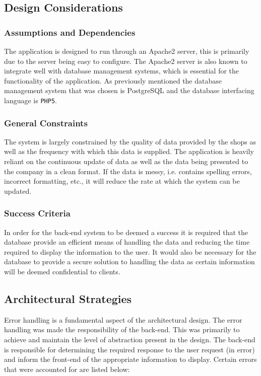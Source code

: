 \documentclass[10pt,twocolumn]{witseiepaper}
\begin{document}
	\subsection{Design Considerations}
	
		\subsubsection{Assumptions and Dependencies}
		
			The application is designed to run through an Apache2 server, this is primarily due to the server being easy to configure. The Apache2 server is also known to integrate well with database management systems, which is essential for the functionality of the application. As previously mentioned the database management system that was chosen is PostgreSQL and the database interfacing language is \texttt{PHP5}.
			
		\subsubsection{General Constraints}
			
			The system is largely constrained by the quality of data provided by the shops as well as the frequency with which this data is supplied. The application is heavily reliant on the continuous update of data as well as the data being presented to the company in a clean format. If the data is messy, i.e. contains spelling errors, incorrect formatting, etc., it will reduce the rate at which the system can be updated.
			
		\subsubsection{Success Criteria}
	
			In order for the back-end system to be deemed a success it is required that the database provide an efficient means of handling the data and reducing the time required to display the information to the user. It would also be necessary for the database to provide a secure solution to handling the data as certain information will be deemed confidential to clients.
	
	\subsection{Architectural Strategies}
	
		Error handling is a fundamental aspect of the architectural design. The error handling was made the responsibility of the back-end. This was primarily to achieve and maintain the level of abstraction present in the design. The back-end is responsible for determining the required response to the user request (in error) and inform the front-end of the appropriate information to display. Certain errors that were accounted for are listed below:
		
\end{document}
